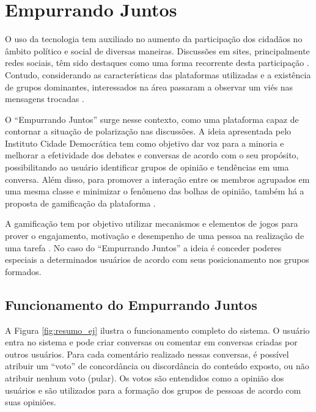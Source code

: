 \chapter{Empurrando Juntos} \label{cap:empurrandojuntos}

O uso da tecnologia tem auxiliado no aumento da participação dos 
cidadãos no âmbito político e social de diversas maneiras. Discussões em sites, principalmente redes sociais, têm sido
destaques como uma forma recorrente desta participação \cite{marques2008participaccao}.
Contudo, considerando as características das plataformas utilizadas e a existência de grupos dominantes, interessados
na área passaram a observar um viés nas mensagens trocadas \cite{empurrandojuntos, marques2008participaccao}. 

O ``Empurrando Juntos'' surge nesse contexto, como uma plataforma capaz de contornar a situação de polarização nas discussões.
A ideia apresentada pelo Instituto Cidade Democrática tem como objetivo dar voz para a minoria e 
melhorar a efetividade dos debates e conversas de acordo com o seu propósito, possibilitando ao usuário
identificar grupos de opinião e tendências em uma conversa. Além disso, para promover a interação entre os membros agrupados em uma mesma classe 
e minimizar o fenômeno das bolhas de opinião, também há a proposta de gamificação da plataforma \cite{empurrandojuntos}.

A gamificação tem por objetivo utilizar mecanismos e elementos de jogos para prover o engajamento, motivação e desempenho
de uma pessoa na realização de uma tarefa \cite{pedreira2015gamification}. No caso do ``Empurrando Juntos'' a ideia é conceder poderes
especiais a determinados usuários de acordo com seus posicionamento nos grupos formados.

\section{Funcionamento do Empurrando Juntos}

  A Figura \ref{fig:resumo_ej} ilustra o funcionamento completo do sistema. O usuário entra no sistema e pode criar conversas ou
  comentar em conversas criadas por outros usuários. Para cada comentário realizado nessas conversas, é possível atribuir um 
  ``voto'' de concordância ou discordância do conteúdo exposto, ou não atribuir nenhum voto (pular).
  Os votos são entendidos como a opinião dos usuários e são utilizados para a formação dos grupos de pessoas de acordo com suas opiniões. 

